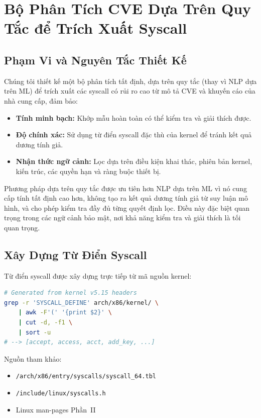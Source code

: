 \appendices
\section{Bộ Phân Tích CVE Dựa Trên Quy Tắc để Trích Xuất Syscall}
\label{appendix:cve_parser}

\subsection{Phạm Vi và Nguyên Tắc Thiết Kế}
\label{subsec:appendix_scope}

Chúng tôi thiết kế một bộ phân tích tất định, dựa trên quy tắc (thay vì NLP dựa trên ML) để trích xuất
các syscall có rủi ro cao từ mô tả CVE và khuyến cáo của nhà cung cấp, đảm bảo:

\begin{itemize}
  \item \textbf{Tính minh bạch:} Khớp mẫu hoàn toàn có thể kiểm tra và giải thích được.
  \item \textbf{Độ chính xác:} Sử dụng từ điển syscall đặc thù của kernel để tránh kết quả dương tính giả.
  \item \textbf{Nhận thức ngữ cảnh:} Lọc dựa trên điều kiện khai thác, phiên bản kernel,
        kiến trúc, các quyền hạn và ràng buộc thiết bị.
\end{itemize}

Phương pháp dựa trên quy tắc được ưu tiên hơn NLP dựa trên ML vì nó cung cấp tính tất định cao hơn,
không tạo ra kết quả dương tính giả từ suy luận mô hình, và cho phép kiểm tra đầy đủ từng
quyết định lọc. Điều này đặc biệt quan trọng trong các ngữ cảnh bảo mật, nơi khả năng kiểm tra
và giải thích là tối quan trọng.

\subsection{Xây Dựng Từ Điển Syscall}
\label{subsec:appendix_dictionary}

Từ điển syscall được xây dựng trực tiếp từ mã nguồn kernel:

\begin{lstlisting}[float=htbp, language=bash, caption={Trích xuất tên syscall từ mã nguồn kernel.}]
# Generated from kernel v5.15 headers
grep -r 'SYSCALL_DEFINE' arch/x86/kernel/ \
    | awk -F'(' '{print $2}' \
    | cut -d, -f1 \
    | sort -u
# --> [accept, access, acct, add_key, ...]
\end{lstlisting}

Nguồn tham khảo:
\begin{itemize}
  \item \texttt{/arch/x86/entry/syscalls/syscall\_64.tbl}
  \item \texttt{/include/linux/syscalls.h}
  \item Linux man-pages Phần~II
\end{itemize}

